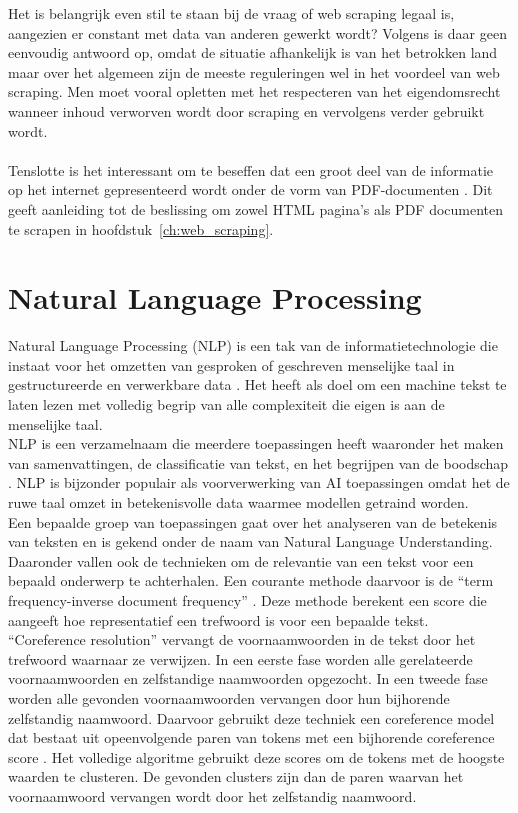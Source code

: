 Het is belangrijk even stil te staan bij de vraag of web scraping legaal is, aangezien er constant met data van anderen gewerkt wordt? Volgens \textcite{EPSI2015} is daar geen eenvoudig antwoord op, omdat de situatie afhankelijk is van het betrokken land maar over het algemeen zijn de meeste reguleringen wel in het voordeel van web scraping. Men moet vooral opletten met het respecteren van het eigendomsrecht wanneer inhoud verworven wordt door scraping en vervolgens verder gebruikt wordt.\\\\
Tenslotte is het interessant om te beseffen dat een groot deel van de informatie op het internet gepresenteerd wordt onder de vorm van PDF-documenten \autocite{Singrodia2019}. Dit geeft aanleiding tot de beslissing om zowel HTML pagina's als PDF documenten te scrapen in hoofdstuk~\ref{ch:web_scraping}.\\
\section{Natural Language Processing}
Natural Language Processing (NLP) is een tak van de informatietechnologie die instaat voor het omzetten van gesproken of geschreven menselijke taal in gestructureerde en verwerkbare data \autocite{Fanni2023}.
Het heeft als doel om een machine tekst te laten lezen met volledig begrip van alle complexiteit die eigen is aan de menselijke taal.\\
NLP is een verzamelnaam die meerdere toepassingen heeft waaronder het maken van samenvattingen, de classificatie van tekst, en het begrijpen van de boodschap \autocite{Khurana2022}. NLP is bijzonder populair als voorverwerking van AI toepassingen omdat het de ruwe taal omzet in betekenisvolle data waarmee modellen getraind worden.\\
Een bepaalde groep van toepassingen gaat over het analyseren van de betekenis van teksten en is gekend onder de naam van Natural Language Understanding. Daaronder vallen ook de technieken om de relevantie van een tekst voor een bepaald onderwerp te achterhalen. Een courante methode daarvoor is de ``term frequency-inverse document frequency'' \autocite{Havrlant2017}. Deze methode berekent een score die aangeeft hoe representatief een trefwoord is voor een bepaalde tekst.\\
``Coreference resolution'' vervangt de voornaamwoorden in de tekst door het trefwoord waarnaar ze verwijzen. In een eerste fase worden alle gerelateerde voornaamwoorden en zelfstandige naamwoorden opgezocht. In een tweede fase worden alle gevonden voornaamwoorden vervangen door hun bijhorende zelfstandig naamwoord. Daarvoor gebruikt deze techniek een coreference model dat bestaat uit opeenvolgende paren van tokens met een bijhorende coreference score \autocite{Lee2017}. Het volledige algoritme \autocite{Explosion2025} gebruikt deze scores om de tokens met de hoogste waarden te clusteren. De gevonden clusters zijn dan de paren waarvan het voornaamwoord vervangen wordt door het zelfstandig naamwoord.
